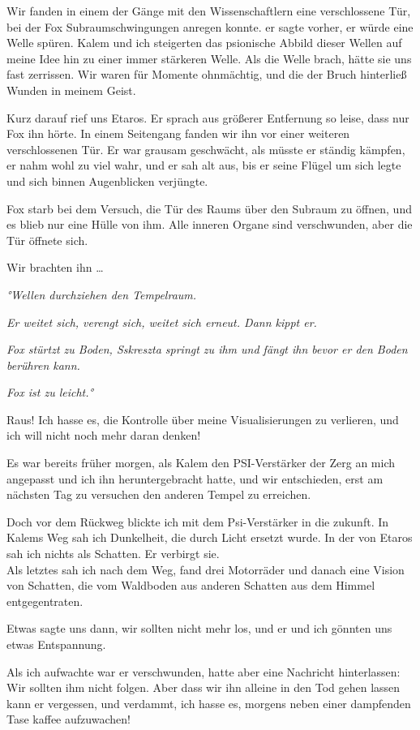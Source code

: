 \documentclass[11pt]{scrartcl}
\begin{document}
Wir fanden in einem der Gänge mit den Wissenschaftlern eine
verschlossene Tür, bei der Fox Subraumschwingungen anregen konnte. er
sagte vorher, er würde eine Welle spüren. Kalem und ich steigerten das
psionische Abbild dieser Wellen auf meine Idee hin zu einer immer
stärkeren Welle. Als die Welle brach, hätte sie uns fast zerrissen. Wir
waren für Momente ohnmächtig, und die der Bruch hinterließ Wunden in
meinem Geist.

Kurz darauf rief uns Etaros. Er sprach aus größerer Entfernung so leise,
dass nur Fox ihn hörte. In einem Seitengang fanden wir ihn vor einer
weiteren verschlossenen Tür. Er war grausam geschwächt, als müsste er
ständig kämpfen, er nahm wohl zu viel wahr, und er sah alt aus, bis er
seine Flügel um sich legte und sich binnen Augenblicken verjüngte.

Fox starb bei dem Versuch, die Tür des Raums über den Subraum zu öffnen,
und es blieb nur eine Hülle von ihm. Alle inneren Organe sind
verschwunden, aber die Tür öffnete sich.

Wir brachten ihn \ldots{}

\emph{°Wellen durchziehen den Tempelraum.}

\emph{Er weitet sich, verengt sich, weitet sich erneut. Dann kippt er.}

\emph{Fox stürtzt zu Boden, Sskreszta springt zu ihm und fängt ihn bevor
er den Boden berühren kann.}

\emph{Fox ist zu leicht.°}

Raus! Ich hasse es, die Kontrolle über meine Visualisierungen zu
verlieren, und ich will nicht noch mehr daran denken!

Es war bereits früher morgen, als Kalem den PSI-Verstärker der Zerg an
mich angepasst und ich ihn heruntergebracht hatte, und wir entschieden,
erst am nächsten Tag zu versuchen den anderen Tempel zu erreichen.

Doch vor dem Rückweg blickte ich mit dem Psi-Verstärker in die zukunft.
In Kalems Weg sah ich Dunkelheit, die durch Licht ersetzt wurde. In der
von Etaros sah ich nichts als Schatten. Er verbirgt sie.\\ Als letztes
sah ich nach dem Weg, fand drei Motorräder und danach eine Vision von
Schatten, die vom Waldboden aus anderen Schatten aus dem Himmel
entgegentraten.

Etwas sagte uns dann, wir sollten nicht mehr los, und er und ich gönnten
uns etwas Entspannung.

Als ich aufwachte war er verschwunden, hatte aber eine Nachricht
hinterlassen: Wir sollten ihm nicht folgen. Aber dass wir ihn alleine in
den Tod gehen lassen kann er vergessen, und verdammt, ich hasse es,
morgens neben einer dampfenden Tase kaffee aufzuwachen!
\end{document}
